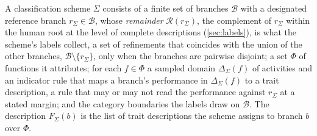 \begin{definition}
\label{def:scheme}
A classification scheme $\Sigma$ consists of a finite set of branches $\mathcal{B}$ with a designated reference branch $r_\Sigma \in \mathcal{B}$, whose \emph{remainder} $\mathcal{R}(r_\Sigma)$, the complement of $r_\Sigma$ within the human root at the level of complete descriptions (\autoref{sec:labels}), is what the scheme's labels collect, a set of refinements that coincides with the union of the other branches, $\mathcal{B} \setminus \{r_\Sigma\}$, only when the branches are pairwise disjoint; a set $\Phi$ of functions it attributes; for each $f \in \Phi$ a sampled domain $\Delta_\Sigma(f)$ of activities and an indicator rule that maps a branch's performance in $\Delta_\Sigma(f)$ to a trait description, a rule that may or may not read the performance against $r_\Sigma$ at a stated margin; and the category boundaries the labels draw on $\mathcal{B}$. The description $F_\Sigma(b)$ is the list of trait descriptions the scheme assigns to branch $b$ over $\Phi$.
\end{definition}


